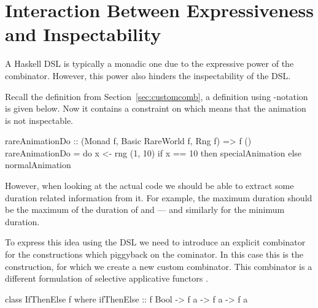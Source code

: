 \section{Interaction Between Expressiveness and Inspectability}
\label{sec:interaction}

A Haskell DSL is typically a monadic one due to the expressive power of the \hs{>>=} combinator. However, this power also hinders the inspectability of the DSL.

Recall the  definition from Section~\ref{sec:customcomb}, a definition using -notation is given below. Now it contains a  constraint on  which means that the animation is not inspectable.

\begin{code}
rareAnimationDo :: (Monad f, Basic RareWorld f, Rng f) => f ()
rareAnimationDo = do
  x <- rng (1, 10)
  if x == 10
    then specialAnimation
    else normalAnimation
\end{code}

However, when looking at the actual code we should be able to extract some duration related information from it. For example, the maximum duration should be the maximum of the duration of  and  --- and similarly for the minimum duration.

To express this idea using the DSL we need to introduce an explicit combinator for the constructions which piggyback on the \hs{>>=} cominator. In this case this is the  construction, for which we create a new custom combinator. This combinator is a different formulation of selective applicative functors \cite{Mokhov:2019:SAF:3352468.3341694}.

\begin{code}
class IfThenElse f where
  ifThenElse :: f Bool -> f a -> f a -> f a
\end{code}

